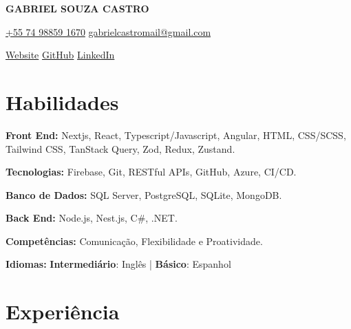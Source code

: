 \documentclass[a4paper,10pt]{article}
\begin{document}

\noindent
\begin{minipage}[t]{0.5\textwidth}
\textbf{\Large GABRIEL SOUZA CASTRO}

\vspace{0.4em}

\end{minipage}%
\begin{minipage}[t]{0.5\textwidth}
\raggedleft
{\color{blue}} \href{https://example.com}{\faPhone \space +55 74 98859 1670} \quad
{\color{blue}} \href{mailto:gabrielcastromail@gmail.com}{\faEnvelope \space gabrielcastromail@gmail.com}

\vspace{0.2em}

{\color{blue}} \href{https://gabrcastro.vercel.app}{\faGlobe \space Website} \quad
{\color{blue}} \href{https://github.com/gabrcastro}{\faGithub \space GitHub} \quad
{\color{blue}} \href{https://linkedin.com/in/gabrielsouzacastro}{\faLinkedin \space LinkedIn} \\
\end{minipage}

\vspace{0.5em}

\section*{Habilidades}
\vspace{0.6em}
\item \textbf{Front End:} Nextjs, React, Typescript/Javascript, Angular, HTML, CSS/SCSS, Tailwind CSS, TanStack Query, Zod, Redux, Zustand.
\item \textbf{Tecnologias:} Firebase, Git, RESTful APIs, GitHub, Azure, CI/CD.
\item \textbf{Banco de Dados:} SQL Server, PostgreSQL, SQLite, MongoDB.
\item \textbf{Back End:} Node.js, Nest.js, C#, .NET.
\item \textbf{Competências:} Comunicação, Flexibilidade e Proatividade.
\item \textbf{Idiomas:} \textbf{Intermediário}: Inglês | \textbf{Básico}: Espanhol

\vspace{1em}

\section*{Experiência}
\vspace{0.6em}
\end{document}
